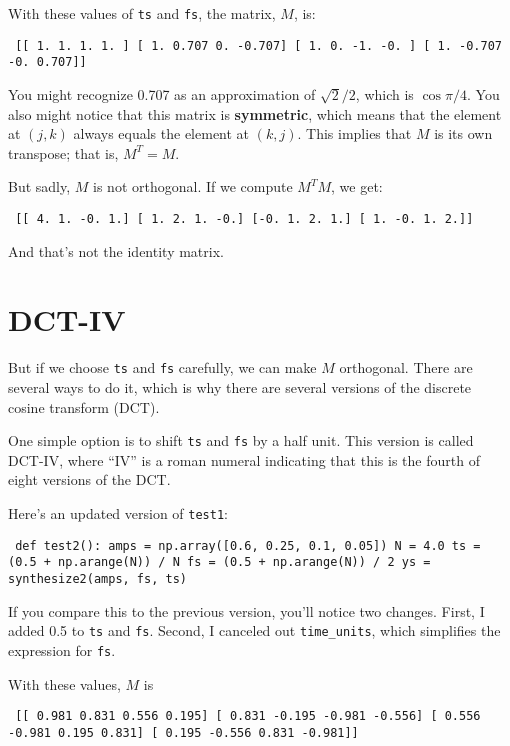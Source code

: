 \documentclass[12pt]{book} \usepackage[width=5.5in,height=8.5in, hmarginratio=3:2,vmarginratio=1:1]{geometry}
\begin{document}
With these values of {\tt ts} and {\tt fs}, the matrix, $M$, is: 

\begin{verbatim} [[ 1. 1. 1. 1. ] [ 1. 0.707 0. -0.707] [ 1. 0. -1. -0. ] [ 1. -0.707 -0. 0.707]] \end{verbatim} 

You might recognize 0.707 as an approximation of $\sqrt{2}/2$, which is $\cos \pi/4$. You also might notice that this matrix is {\bf symmetric}, which means that the element at $(j, k)$ always equals the element at $(k, j)$. This implies that $M$ is its own transpose; that is, $M^T = M$. 

But sadly, $M$ is not orthogonal. If we compute $M^TM$, we get: 

\begin{verbatim} [[ 4. 1. -0. 1.] [ 1. 2. 1. -0.] [-0. 1. 2. 1.] [ 1. -0. 1. 2.]] \end{verbatim} 

And that's not the identity matrix. 

\section{DCT-IV} \label{dctiv} 

But if we choose {\tt ts} and {\tt fs} carefully, we can make $M$ orthogonal. There are several ways to do it, which is why there are several versions of the discrete cosine transform (DCT). 

One simple option is to shift {\tt ts} and {\tt fs} by a half unit. This version is called DCT-IV, where ``IV'' is a roman numeral indicating that this is the fourth of eight versions of the DCT. 

Here's an updated version of {\tt test1}: 

\begin{verbatim} def test2(): amps = np.array([0.6, 0.25, 0.1, 0.05]) N = 4.0 ts = (0.5 + np.arange(N)) / N fs = (0.5 + np.arange(N)) / 2 ys = synthesize2(amps, fs, ts) \end{verbatim} 

If you compare this to the previous version, you'll notice two changes. First, I added 0.5 to {\tt ts} and {\tt fs}. Second, I canceled out \verb"time_units", which simplifies the expression for {\tt fs}. 

With these values, $M$ is 

\begin{verbatim} [[ 0.981 0.831 0.556 0.195] [ 0.831 -0.195 -0.981 -0.556] [ 0.556 -0.981 0.195 0.831] [ 0.195 -0.556 0.831 -0.981]] \end{verbatim} 
\end{document}
